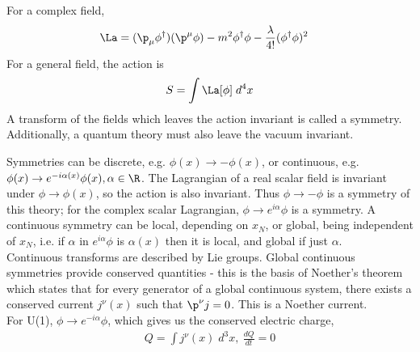 \documentclass[a4paper, 11pt, normalem]{report}
\begin{document}
For a complex field,
\begin{align}
    \La &= (\p_\mu\phi^\dagger)(\p^\mu\phi) - m^2\phi^\dagger\phi - \frac{\lambda}{4!}(\phi^\dagger\phi)^2
\end{align}
For a general field, the action is
\begin{align}
    S = \int \La[\phi]\;d^4x
\end{align}
A transform of the fields which leaves the action invariant is called a symmetry.
Additionally, a quantum theory must also leave the vacuum invariant.

Symmetries can be discrete, e.g. $\phi(x)\to-\phi(x)$, or continuous, e.g. $\phi(x)\to e^{-i\alpha(x)}\phi(x),\alpha\in\R$.
The Lagrangian of a real scalar field is invariant under $\phi\to\phi(x)$, so the action is also invariant.
Thus $\phi\to-\phi$ is a symmetry of this theory; for the complex scalar Lagrangian, $\phi\to e^{i\alpha}\phi$ is a symmetry.
A continuous symmetry can be local, depending on $x_N$, or global, being independent of $x_N$, i.e. if $\alpha$ in $e^{i\alpha}\phi$ is $\alpha(x)$ then it is local, and global if just $\alpha$.\\
Continuous transforms are described by Lie groups.
Global continuous symmetries provide conserved quantities - this is the basis of Noether's theorem which states that for every generator of a global continuous system, there exists a conserved current $j^\nu(x)$ such that $\p^\nu j = 0$.
This is a Noether current. \\
For U(1), $\phi\to e^{-i\alpha}\phi$, which gives us the conserved electric charge,
\begin{align}
    Q = \int j^\nu(x)\;d^3x,~ \frac{dQ}{dt} = 0
\end{align}
\end{document}
